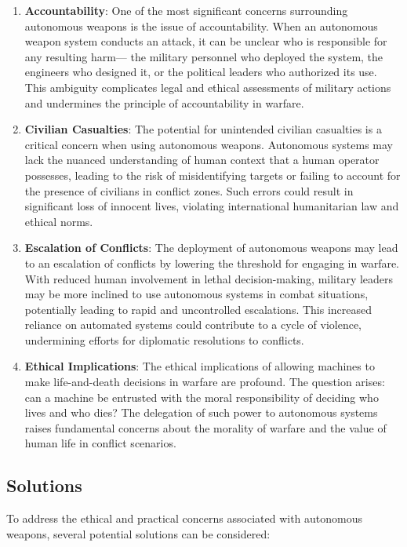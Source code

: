 \begin{enumerate}
    \item \textbf{Accountability}: One of the most significant concerns surrounding autonomous weapons is the issue of accountability. When an autonomous weapon system conducts an attack, it can be unclear who is responsible for any resulting harm— the military personnel who deployed the system, the engineers who designed it, or the political leaders who authorized its use. This ambiguity complicates legal and ethical assessments of military actions and undermines the principle of accountability in warfare.

    \item \textbf{Civilian Casualties}: The potential for unintended civilian casualties is a critical concern when using autonomous weapons. Autonomous systems may lack the nuanced understanding of human context that a human operator possesses, leading to the risk of misidentifying targets or failing to account for the presence of civilians in conflict zones. Such errors could result in significant loss of innocent lives, violating international humanitarian law and ethical norms.

    \item \textbf{Escalation of Conflicts}: The deployment of autonomous weapons may lead to an escalation of conflicts by lowering the threshold for engaging in warfare. With reduced human involvement in lethal decision-making, military leaders may be more inclined to use autonomous systems in combat situations, potentially leading to rapid and uncontrolled escalations. This increased reliance on automated systems could contribute to a cycle of violence, undermining efforts for diplomatic resolutions to conflicts.

    \item \textbf{Ethical Implications}: The ethical implications of allowing machines to make life-and-death decisions in warfare are profound. The question arises: can a machine be entrusted with the moral responsibility of deciding who lives and who dies? The delegation of such power to autonomous systems raises fundamental concerns about the morality of warfare and the value of human life in conflict scenarios.
\end{enumerate}

\subsection{Solutions}
To address the ethical and practical concerns associated with autonomous weapons, several potential solutions can be considered:

